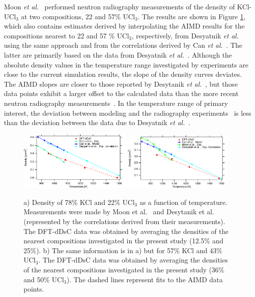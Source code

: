 \documentclass[preprint,3p,10pt,twocolumn,number,sort&compress]{elsarticle}
\begin{document}
Moon \textit{et al.}~\cite{Moon} performed neutron radiography measurements of the density of KCl-UCl$_3$ at two compositions, 22 and 57\% UCl$_3$. The results are shown in Figure \ref{fig:neutron}, which also contains estimates derived by interpolating the AIMD results for the compositions nearest to 22 and 57 \% UCl$_3$, respectively, from Desyatnik \textit{et al.}~\cite{DesyatnikKCl} using the same approach and from the correlations derived by Can \textit{et al.}~\cite{agca2022}. The latter are primarily based on the data from Desyatnik \textit{et al.}~\cite{DesyatnikKCl}. Although the absolute density values in the temperature range investigated by experiments are close to the current simulation results, the slope of the density curves deviates. The AIMD slopes are closer to those reported by Desytanik \textit{et al.}~\cite{DesyatnikKCl}, but those data points exhibit a larger offset to the calculated data than the more recent neutron radiography measurements~\cite{Moon}. In the temperature range of primary interest, the deviation between modeling and the radiography experiments~\cite{Moon} is less than the deviation between the data due to Desyatnik \textit{et al.}~\cite{DesyatnikKCl}.

\begin{figure}[htb]
\centering
\includegraphics[width=0.49\textwidth]{KCl_UCl3_neutron.pdf} \includegraphics[width=0.48\textwidth]{KCl_UCl3_neutronb.pdf}
\caption{a) Density of 78\% KCl and 22\% UCl$_3$ as a function of temperature. Measurements were made by Moon et al.~\cite{Moon} and Desytanik et al.~\cite{DesyatnikKCl} (represented by the correlations derived from their measurements). The DFT-dDsC data was obtained by averaging the densities of the nearest compositions investigated in the present study (12.5\% and 25\%). b) The same information is in a) but for 57\% KCl and 43\% UCl$_3$. The DFT-dDsC data was obtained by averaging the densities of the nearest compositions investigated in the present study (36\% and 50\% UCl$_3$). The dashed lines represent fits to the AIMD data points.}
\label{fig:neutron}
\end{figure}
\end{document}

